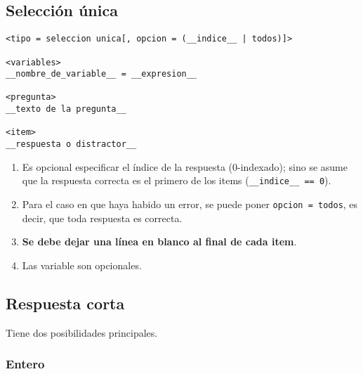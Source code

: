 \documentclass[12pt]{article}
\theoremstyle{definition}
\begin{document}
\subsection{Selecci\'on \'unica}

\begin{verbatim}
<tipo = seleccion unica[, opcion = (__indice__ | todos)]>

<variables>
__nombre_de_variable__ = __expresion__

<pregunta>
__texto de la pregunta__

<item>
__respuesta o distractor__

\end{verbatim}

\begin{enumerate}
  \item Es opcional especificar el \'indice de la respuesta (0-indexado); sino se asume que la respuesta correcta es el primero de los items (\verb|__indice__ == 0|).
  \item Para el caso en que haya habido un error, se puede poner \verb|opcion = todos|, es decir, que toda respuesta es correcta.
  \item \textbf{Se debe dejar una l\'inea en blanco al final de cada item}.
  \item Las variable son opcionales.
\end{enumerate}


\subsection{Respuesta corta}

Tiene dos posibilidades principales.

\subsubsection{Entero}
\end{document}
